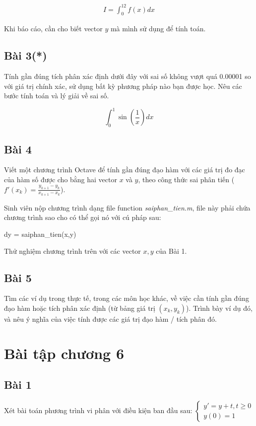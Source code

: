 \documentclass[12pt]{article}
\begin{document}
\begin{align*}
 I = \int_0^{12} f(x) dx
\end{align*}

Khi báo cáo, cần cho biết vector $y$ mà mình sử dụng để tính toán.

\subsection{Bài 3(*)}

Tính gần đúng tích phân xác định dưới đây với sai số không vượt quá 0.00001 so với giá trị chính xác, sử dụng bất kỳ phương pháp nào bạn được học. Nêu các bước tính toán và lý giải về sai số.

\[\int_{0}^1  \sin \left( \frac 1 x \right) dx \]

\subsection{Bài 4}
Viết một chương trình Octave để tính gần đúng đạo hàm với các giá trị đo đạc của hàm số được cho bằng hai vector $x$ và $y$, theo công thức sai phân tiến ($f'(x_k)=\frac{y_{k+1}-y_k}{x_{k+1}-x_k}$).

Sinh viên nộp chương trình dạng file function \emph{saiphan\_tien.m}, file này phải chứa chương trình sao cho có thể gọi nó với cú pháp sau:

dy = saiphan\_tien(x,y)

Thử nghiệm chương trình trên với các vector $x, y$ của Bài 1.

\subsection{Bài 5}
Tìm các ví dụ trong thực tế, trong các môn học khác, về việc cần tính gần đúng đạo hàm hoặc tích phân xác định (từ bảng giá trị $(x_k,y_k)$). Trình bày ví dụ đó, và nêu ý nghĩa của việc tính được các giá trị đạo hàm / tích phân đó.

\section{Bài tập chương 6}

\subsection{Bài 1}

Xét bài toán phương trình vi phân với điều kiện ban đầu sau:
$
 \left\lbrace \begin{array}{l}
               y' = y+t, t \geq 0 \\
               y(0)=1
              \end{array}
\right.
$
\end{document}
